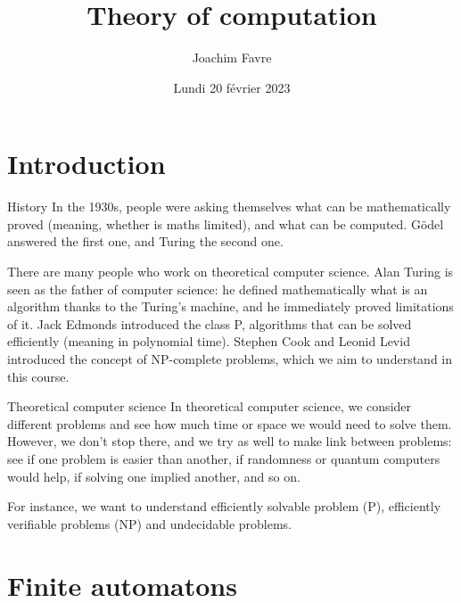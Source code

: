 \documentclass[a4paper]{article}
\title{Theory of computation}
\author{Joachim Favre}
\date{Lundi 20 février 2023}
\begin{document}
\maketitle


\section{Introduction}
\begin{parag}{History}
    In the 1930s, people were asking themselves what can be mathematically proved (meaning, whether is maths limited), and what can be computed. Gödel answered the first one, and Turing the second one.

    There are many people who work on theoretical computer science. Alan Turing is seen as the father of computer science: he defined mathematically what is an algorithm thanks to the Turing's machine, and he immediately proved limitations of it. Jack Edmonds introduced the class P, algorithms that can be solved efficiently (meaning in polynomial time). Stephen Cook and Leonid Levid introduced the concept of NP-complete problems, which we aim to understand in this course. 
\end{parag}

\begin{parag}{Theoretical computer science}
    In theoretical computer science, we consider different problems and see how much time or space we would need to solve them. However, we don't stop there, and we try as well to make link between problems: see if one problem is easier than another, if randomness or quantum computers would help, if solving one implied another, and so on.

    For instance, we want to understand efficiently solvable problem (P), efficiently verifiable problems (NP) and undecidable problems.
\end{parag}

\section{Finite automatons}
\end{document}
